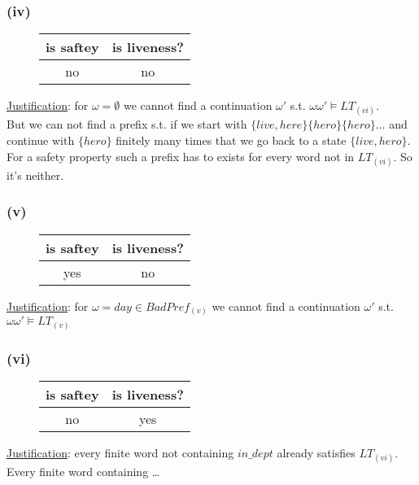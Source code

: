 \documentclass[11pt]{article}
\begin{document}
\subsubsection*{(iv)}
	\vspace*{-2em}
	\begin{figure}[H]
		\centering
		\begin{tabular}{c | c}
			is saftey & is liveness? \\ \hline
			no & no  \\
		\end{tabular}
	\end{figure}
	\underline{Justification}: for $\omega = \emptyset$ we cannot find a continuation $\omega'$ s.t. $\omega\omega' \models LT_{(vi)}$. \\
	But we can not find a prefix s.t. if we start with $\{live,here\}\{hero\}\{hero\}\dots$ and continue with $\{hero\}$ finitely many times that we go back to a state $\{live,hero\}$. For a safety property such a prefix has to exists for every word not in $LT_{(vi)}$. So it's neither.

\subsubsection*{(v)}
	\vspace*{-2em}
	\begin{figure}[H]
		\centering
		\begin{tabular}{c | c}
			is saftey & is liveness? \\ \hline
			yes & no \\
		\end{tabular}
	\end{figure}
	\underline{Justification}: for $\omega = {day} \in BadPref_{(v)}$ we cannot find a continuation $\omega'$ s.t. $\omega\omega' \models LT_{(v)}$

\subsubsection*{(vi)}
	\vspace*{-2em}
	\begin{figure}[H]
		\centering
		\begin{tabular}{c | c}
			is saftey & is liveness? \\ \hline
			no & yes \\
		\end{tabular}
	\end{figure}
	\underline{Justification}: every finite word not containing $in\_dept$ already satisfies $LT_{(vi)}$. Every finite word containing \dots %
\end{document}
